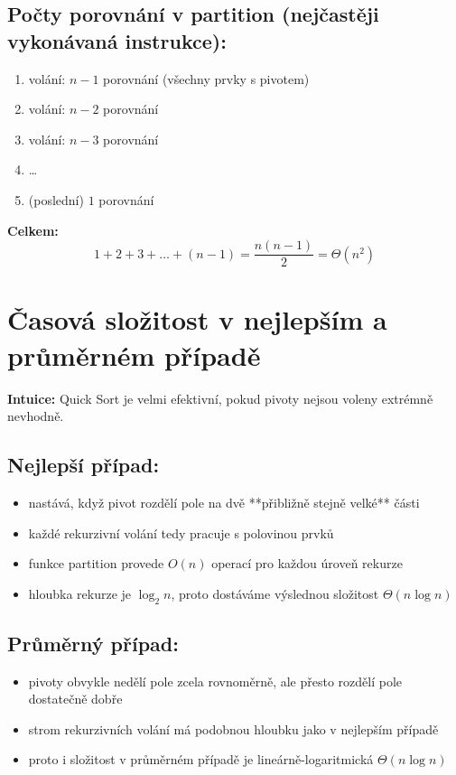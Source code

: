 \documentclass[openany,12pt,a4paper]{book}
\begin{document}
\subsection*{Počty porovnání v partition (nejčastěji vykonávaná instrukce):}
\begin{enumerate}
    \item volání: $n-1$ porovnání (všechny prvky s pivotem)
    \item volání: $n-2$ porovnání
    \item volání: $n-3$ porovnání
    \item \dots
    \item (poslední) $1$ porovnání
\end{enumerate}

\medskip

\textbf{Celkem:}
$$ 1 + 2 + 3 + \dots + (n-1) = \frac{n(n-1)}{2} = \Theta(n^2) $$

\section*{Časová složitost v nejlepším a průměrném případě}

\textbf{Intuice:} Quick Sort je velmi efektivní, pokud pivoty nejsou voleny extrémně nevhodně.

\subsection*{Nejlepší případ:}
\begin{itemize}
    \item nastává, když pivot rozdělí pole na dvě **přibližně stejně velké** části
    \item každé rekurzivní volání tedy pracuje s polovinou prvků
    \item funkce partition provede $O(n)$ operací pro každou úroveň rekurze
    \item hloubka rekurze je $\log_2 n$, proto dostáváme výslednou složitost $\Theta(n \log n)$
\end{itemize}

\subsection*{Průměrný případ:}
\begin{itemize}
    \item pivoty obvykle nedělí pole zcela rovnoměrně, ale přesto rozdělí pole \glqq dostatečně dobře\grqq
    \item strom rekurzivních volání má podobnou hloubku jako v nejlepším případě
    \item proto i složitost v průměrném případě je lineárně-logaritmická $\Theta(n \log n)$
\end{itemize}
\end{document}
